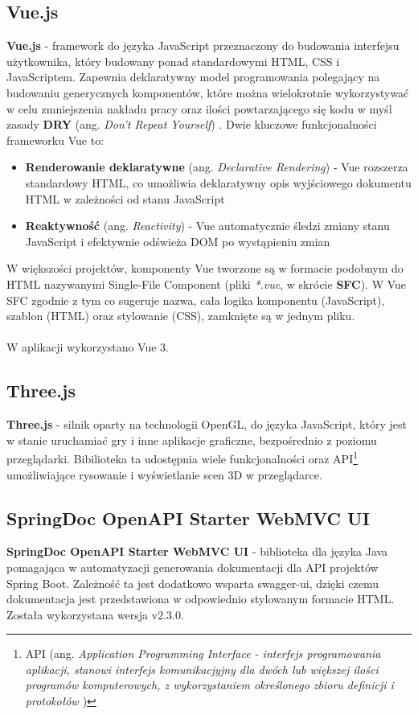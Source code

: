 \documentclass[11pt,a4paper]{article}
\begin{document}
\subsection{Vue.js}
\textbf{Vue.js} \cite{vuejs} - framework do języka JavaScript przeznaczony do budowania interfejsu użytkownika, który budowany ponad standardowymi HTML, CSS i JavaScriptem. Zapewnia deklaratywny model programowania polegający na budowaniu generycznych komponentów, które można wielokrotnie wykorzystywać w celu zmniejszenia nakładu pracy oraz ilości powtarzającego się kodu w myśl zasady \textbf{DRY} (ang. \textsl{Don't Repeat Yourself}) \cite{dry-principle}. Dwie kluczowe funkcjonalności frameworku Vue to: 
\begin{itemize}
    \item \textbf{Renderowanie deklaratywne} (ang. \textsl{Declarative Rendering}) - Vue rozszerza standardowy HTML, co umożliwia deklaratywny opis wyjściowego dokumentu HTML w zależności od stanu JavaScript
    \item \textbf{Reaktywność} (ang. \textsl{Reactivity}) - Vue automatycznie śledzi zmiany stanu JavaScript i efektywnie odświeża DOM po wystąpieniu zmian
\end{itemize}

\noindent
W większości projektów, komponenty Vue tworzone są w formacie podobnym do HTML nazywanymi Single-File Component \cite{vue-sfc} (pliki \textsl{*.vue}, w skrócie \textbf{SFC}). W Vue SFC zgodnie z tym co sugeruje nazwa, cała logika komponentu (JavaScript), szablon (HTML) oraz stylowanie (CSS), zamknięte są w jednym pliku.\\
\\\noindent
W aplikacji wykorzystano Vue 3.

\subsection{Three.js}
\textbf{Three.js} \cite{three} - silnik oparty na technologii OpenGL, do języka JavaScript, który jest w stanie uruchamiać gry i inne aplikacje graficzne, bezpośrednio z poziomu przeglądarki. Bibilioteka ta udostępnia wiele funkcjonalności oraz API\footnote{API (ang. \textsl{Application Programming Interface - interfejs programowania aplikacji, stanowi interfejs komunikacjyjny dla dwóch lub większej ilości programów komputerowych, z wykorzystaniem określonego zbioru definicji i protokołów \cite{api}})} umożliwiające rysowanie i wyświetlanie scen 3D w przeglądarce.

\subsection{SpringDoc OpenAPI Starter WebMVC UI}
\textbf{SpringDoc OpenAPI Starter WebMVC UI\cite{springdoc}} - biblioteka dla języka Java pomagająca w automatyzacji generowania dokumentacji dla API projektów Spring Boot. Zależność ta jest dodatkowo wsparta swagger-ui, dzięki czemu dokumentacja jest przedstawiona w odpowiednio stylowanym formacie HTML. Została wykorzystana wersja v2.3.0.
\end{document}
